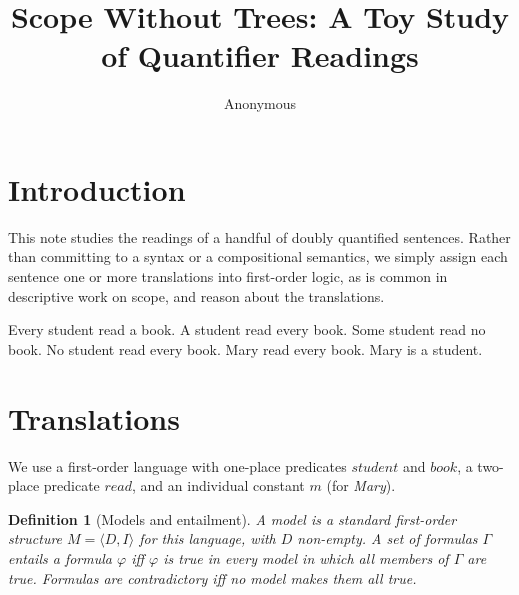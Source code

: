 \documentclass{article}
\title{Scope Without Trees: A Toy Study of Quantifier Readings}
\author{Anonymous}
\newtheorem{definition}{Definition}
\begin{document}
\maketitle

\section{Introduction}

This note studies the readings of a handful of doubly quantified sentences.
Rather than committing to a syntax or a compositional semantics, we simply
assign each sentence one or more translations into first-order logic, as is
common in descriptive work on scope, and reason about the translations.

\begin{exe}
  \ex\label{ex:every-a} Every student read a book.
  \ex\label{ex:a-every} A student read every book.
  \ex\label{ex:some-no} Some student read no book.
  \ex\label{ex:no-every} No student read every book.
  \ex\label{ex:mary-every} Mary read every book.
  \ex\label{ex:mary-student} Mary is a student.
\end{exe}

\section{Translations}

We use a first-order language with one-place predicates $\mathit{student}$
and $\mathit{book}$, a two-place predicate $\mathit{read}$, and an individual
constant $m$ (for \textit{Mary}).

\begin{definition}[Models and entailment]\label{def:models}
A model is a standard first-order structure $M = \langle D, I\rangle$ for this
language, with $D$ non-empty. A set of formulas $\Gamma$ \emph{entails} a
formula $\varphi$ iff $\varphi$ is true in every model in which all members of
$\Gamma$ are true. Formulas are \emph{contradictory} iff no model makes them
all true.
\end{definition}
\end{document}
